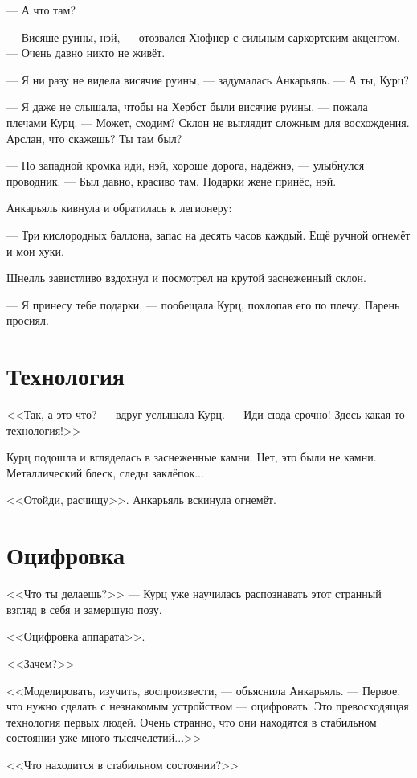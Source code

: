 \documentclass[a4paper,10pt,fleqn]{book}\usepackage{polyglossia}\setdefaultlanguage{english}\setotherlanguage{russian}\defaultfontfeatures{Ligatures=TeX,Mapping=tex-text}\usepackage{xcolor}\definecolor{lightgray}{HTML}{bbbbbb}\color{lightgray}\newcommand{\ml}[3]{\textcolor{black}{#3}}
\begin{document}
--- А что там?

--- Висяше руины, нэй, --- отозвался Хюфнер с сильным саркортским акцентом.
--- Очень давно никто не живёт.

--- Я ни разу не видела висячие руины, --- задумалась Анкарьяль.
--- А ты, Курц?

--- Я даже не слышала, чтобы на Хербст были висячие руины, --- пожала плечами Курц.
--- Может, сходим?
Склон не выглядит сложным для восхождения.
Арслан, что скажешь?
Ты там был?

--- По западной кромка иди, нэй, хороше дорога, надёжнэ, --- улыбнулся проводник.
--- Был давно, красиво там.
Подарки жене принёс, нэй.

Анкарьяль кивнула и обратилась к легионеру:

--- Три кислородных баллона, запас на десять часов каждый.
Ещё ручной огнемёт и мои хуки.

Шнелль завистливо вздохнул и посмотрел на крутой заснеженный склон.

--- Я принесу тебе подарки, --- пообещала Курц, похлопав его по плечу.
Парень просиял.

\section{Технология}

<<Так, а это что? --- вдруг услышала Курц.
--- Иди сюда срочно!
Здесь какая-то технология!>>

Курц подошла и вгляделась в заснеженные камни.
Нет, это были не камни.
Металлический блеск, следы заклёпок...

<<Отойди, расчищу>>.
Анкарьяль вскинула огнемёт.

\section{Оцифровка}

<<Что ты делаешь?>> --- Курц уже научилась распознавать этот странный взгляд в себя и замершую позу.

<<Оцифровка аппарата>>.

<<Зачем?>>

<<Моделировать, изучить, воспроизвести, --- объяснила Анкарьяль.
--- Первое, что нужно сделать с незнакомым устройством --- оцифровать.
Это превосходящая технология первых людей.
Очень странно, что они находятся в стабильном состоянии уже много тысячелетий...>>

<<Что находится в стабильном состоянии?>>
\end{document}
